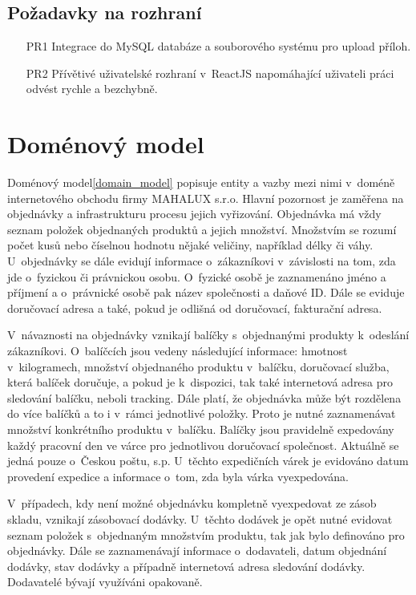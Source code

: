 \documentclass[thesis=B,czech]{FITthesis}[2012/06/26]
\begin{document}
\subsection{Požadavky na rozhraní}
\begin{enumerate}
	\item[PR1] Integrace do MySQL databáze a souborového systému pro upload příloh.
	\item[PR2] Přívětivé uživatelské rozhraní v~ReactJS napomáhající uživateli práci odvést rychle a bezchybně.
\end{enumerate}

\section{Doménový model}
	Doménový model\ref{domain_model} popisuje entity a vazby mezi nimi v~doméně internetového obchodu firmy MAHALUX s.r.o. Hlavní pozornost je zaměřena na objednávky a infrastrukturu procesu jejich vyřizování. Objednávka má vždy seznam položek objednaných produktů a jejich množství. Množstvím se rozumí počet kusů nebo číselnou hodnotu nějaké veličiny, například délky či váhy. U~objednávky se dále evidují informace o~zákazníkovi v~závislosti na tom, zda jde o~fyzickou či právnickou osobu. O~fyzické osobě je zaznamenáno jméno a příjmení a o~právnické osobě pak název společnosti a daňové ID. Dále se eviduje doručovací adresa a také, pokud je odlišná od doručovací, fakturační adresa.
	
	V~návaznosti na objednávky vznikají balíčky s~objednanými produkty k~odeslání zákazníkovi. O~balíčcích jsou vedeny následující informace: hmotnost v~kilogramech, množství objednaného produktu v~balíčku, doručovací služba, která balíček doručuje, a pokud je k~dispozici, tak také internetová adresa pro sledování balíčku, neboli tracking. Dále platí, že objednávka může být rozdělena do více balíčků a to i v~rámci jednotlivé položky. Proto je nutné zaznamenávat množství konkrétního produktu v~balíčku. Balíčky jsou pravidelně expedovány každý pracovní den ve várce pro jednotlivou doručovací společnost. Aktuálně se jedná pouze o~Českou poštu, s.p. U~těchto expedičních várek je evidováno datum provedení expedice a informace o~tom, zda byla várka vyexpedována.
	
	V~případech, kdy není možné objednávku kompletně vyexpedovat ze zásob skladu, vznikají zásobovací dodávky. U~těchto dodávek je opět nutné evidovat seznam položek s~objednaným množstvím produktu, tak jak bylo definováno pro objednávky. Dále se zaznamenávají informace o~dodavateli, datum objednání dodávky, stav dodávky a případně internetová adresa sledování dodávky. Dodavatelé bývají využíváni opakovaně.
	
\end{document}

